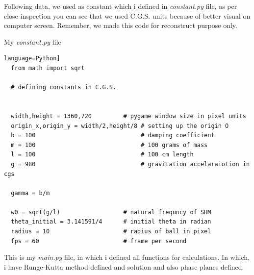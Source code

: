 \documentclass[11pt,a4paper]{article}
\begin{document}
Following data, we used as constant which i defined in \emph{constant.py} file, as per close inspection you can see that we used C.G.S. units because of better visual on computer screen. Remember, we made this code for reconstruct purpose only.

My \emph{constant.py} file

\begin{lstlisting}language=Python]
  from math import sqrt

  # defining constants in C.G.S.


  width,height = 1360,720         # pygame window size in pixel units
  origin_x,origin_y = width/2,height/8 # setting up the origin O
  b = 100                              # damping coefficient
  m = 100                              # 100 grams of mass
  l = 100                              # 100 cm length
  g = 980                              # gravitation accelaraiotion in cgs

  gamma = b/m

  w0 = sqrt(g/l)                  # natural frequncy of SHM
  theta_initial = 3.141591/4      # initial theta in radian
  radius = 10                     # radius of ball in pixel
  fps = 60                        # frame per second
\end{lstlisting}

This is my \emph{main.py} file, in which i defined all functions for calculations. In which, i have Runge-Kutta method defined and solution and also phase planes defined.
\end{document}
